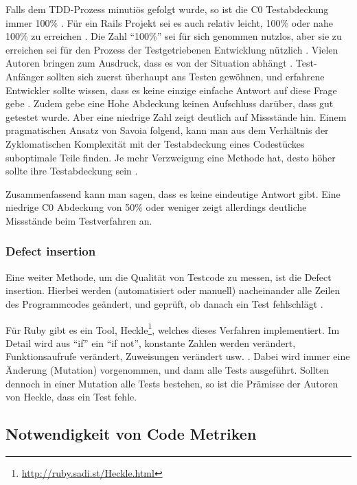  Falls dem TDD-Prozess minutiös gefolgt wurde, so ist die C0 Testabdeckung immer 100\% \citep{beck_test_2002}. Für ein Rails Projekt sei es auch relativ leicht, 100\% oder nahe 100\% zu erreichen \citep{rappin_rails_2011}. Die Zahl "`100\%"' sei für sich genommen nutzlos, aber sie zu erreichen sei für den Prozess der Testgetriebenen Entwicklung nützlich \citep[S. 270]{rappin_rails_2011}. Vielen Autoren bringen zum Ausdruck, dass es von der Situation abhängt \citep{infoq_2007}. Test-Anfänger sollten sich zuerst überhaupt ans Testen gewöhnen, und erfahrene Entwickler sollte wissen, dass es keine einzige einfache Antwort auf diese Frage gebe \citep{infoq_2007}. Zudem gebe eine Hohe Abdeckung keinen Aufschluss darüber, dass gut getestet wurde. Aber eine niedrige Zahl zeigt deutlich auf Missstände hin.
 Einem pragmatischen Ansatz von Savoia folgend, kann man aus dem Verhältnis der Zyklomatischen Komplexität mit der Testabdeckung eines Codestückes suboptimale Teile finden. Je mehr Verzweigung eine Methode hat, desto höher sollte ihre Testabdeckung sein \citep{alberto_savoia_code_2007}.
 
 Zusammenfassend kann man sagen, dass es keine eindeutige Antwort gibt. Eine niedrige C0 Abdeckung von 50\% oder weniger zeigt allerdings deutliche Missstände beim Testverfahren an.
 
 \subsubsection{Defect insertion}
 Eine weiter Methode, um die Qualität von Testcode zu messen, ist die Defect insertion. Hierbei werden (automatisiert oder manuell) nacheinander alle Zeilen des Programmcodes geändert, und geprüft, ob danach ein Test fehlschlägt \citep{beck_test_2002}.
 
 Für Ruby gibt es ein Tool, Heckle\footnote{\url{http://ruby.sadi.st/Heckle.html}}, welches dieses Verfahren implementiert. Im Detail wird aus "`if"' ein "`if not"', konstante Zahlen werden verändert, Funktionsaufrufe verändert, Zuweisungen verändert usw. \citep{ruby_sadists_confessions_2010}. Dabei wird immer eine Änderung (Mutation) vorgenommen, und dann alle Tests ausgeführt. Sollten dennoch in einer Mutation alle Tests bestehen, so ist die Prämisse der Autoren von Heckle, dass ein Test fehle.
 
 \subsection{Notwendigkeit von Code Metriken}
 
